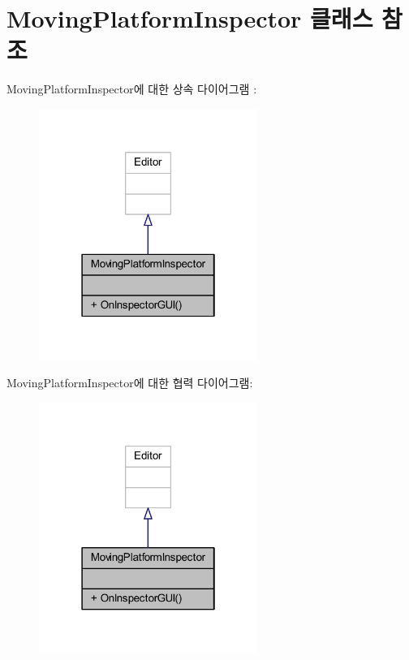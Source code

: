 \hypertarget{class_moving_platform_inspector}{}\section{Moving\+Platform\+Inspector 클래스 참조}
\label{class_moving_platform_inspector}


Moving\+Platform\+Inspector에 대한 상속 다이어그램 \+: \nopagebreak
\begin{figure}[H]
\begin{center}
\leavevmode
\includegraphics[width=202pt]{d4/db6/class_moving_platform_inspector__inherit__graph}
\end{center}
\end{figure}


Moving\+Platform\+Inspector에 대한 협력 다이어그램\+:\nopagebreak
\begin{figure}[H]
\begin{center}
\leavevmode
\includegraphics[width=202pt]{dd/d9f/class_moving_platform_inspector__coll__graph}
\end{center}
\end{figure}
